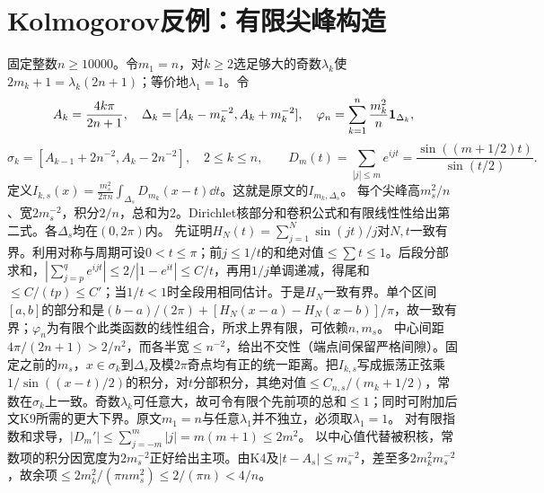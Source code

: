 \documentclass[UTF8,fontset=fandol,11pt]{ctexart}
\begin{document}
\section{Kolmogorov反例：有限尖峰构造}
固定整数$n\ge10000$。令$m_1=n$，对$k\ge2$选足够大的奇数$\lambda_k$使$2m_k+1=\lambda_k(2n+1)$；等价地$\lambda_1=1$。令
\[A_k=\frac{4k\pi}{2n+1},\quad\Delta_k=[A_k-m_k^{-2},A_k+m_k^{-2}],\quad\varphi_n=\sum_{k=1}^n\frac{m_k^2}{n}\mathbf1_{\Delta_k},\]
\[\sigma_k=[A_{k-1}+2n^{-2},A_k-2n^{-2}],\quad 2\le k\le n,\qquad D_m(t)=\sum_{|j|\le m}e^{ijt}=\frac{\sin((m+1/2)t)}{\sin(t/2)}.\]
定义$I_{k,s}(x)=\frac{m_s^2}{2\pi n}\int_{\Delta_s}D_{m_k}(x-t)\dd t$。这就是原文的$I_{m_k,\Delta_s}$。
每个尖峰高$m_s^2/n$、宽$2m_s^{-2}$，积分$2/n$，总和为$2$。Dirichlet核部分和卷积公式和有限线性性给出第二式。各$\Delta_s$均在$(0,2\pi)$内。
先证明$H_N(t)=\sum_{j=1}^N\sin(jt)/j$对$N,t$一致有界。利用对称与周期可设$0<t\le\pi$；前$j\le1/t$的和绝对值$\le\sum t\le1$。后段分部求和，$|\sum_{j=p}^q e^{ijt}|\le2/|1-e^{it}|\le C/t$，再用$1/j$单调递减，得尾和$\le C/(tp)\le C'$；当$1/t<1$时全段用相同估计。于是$H_N$一致有界。单个区间$[a,b]$的部分和是$(b-a)/(2\pi)+[H_N(x-a)-H_N(x-b)]/\pi$，故一致有界；$\varphi_n$为有限个此类函数的线性组合，所求上界有限，可依赖$n,m_s$。
中心间距$4\pi/(2n+1)>2/n^2$，而各半宽$\le n^{-2}$，给出不交性（端点间保留严格间隙）。固定之前的$m_s$，$x\in\sigma_k$到$\Delta_s$及模$2\pi$奇点均有正的统一距离。把$I_{k,s}$写成振荡正弦乘$1/\sin((x-t)/2)$的积分，对$t$分部积分，其绝对值$\le C_{n,s}/(m_k+1/2)$，常数在$\sigma_k$上一致。奇数$\lambda_k$可任意大，故可令有限个先前项的总和$\le1$；同时可附加后文K9所需的更大下界。原文$m_1=n$与任意$\lambda_1$并不独立，必须取$\lambda_1=1$。
对有限指数和求导，$|D_m'|\le\sum_{j=-m}^m|j|=m(m+1)\le2m^2$。
以中心值代替被积核，常数项的积分因宽度为$2m_s^{-2}$正好给出主项。由K4及$|t-A_s|\le m_s^{-2}$，差至多$2m_k^2m_s^{-2}$，故余项$\le2m_k^2/(\pi n m_s^2)\le2/(\pi n)<4/n$。
\end{document}
